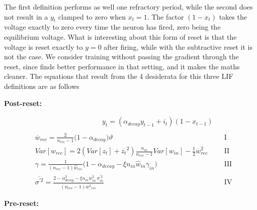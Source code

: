 The first definition performs as well one refractory period, while the second does not result in a $y_t$ clamped to zero when $x_t=1$.
The factor $(1 - x_t)$ takes the voltage exactly to zero every time the neuron has fired, zero being the equilibrium voltage. What is interesting about this form of reset is that the voltage is reset exactly to $y=0$ after firing, while with the subtractive reset it is not the case. 
We consider training without passing the gradient through the reset, since \cite{zenke2021remarkable} finds better performance in that setting, and it makes the maths cleaner.
The equations that result from the 4 desiderata for this three LIF definitions are as follows



\vspace{.7cm}
\textbf{Post-reset:}
\vspace{-.8cm}

{\small
\begin{align*}
&\hspace{4cm} y_t =  (\alpha_{decay}y_{t-1} +i_t)(1 - x_{t-1})\\  \nonumber \\
    &\overline{w}_{rec}=
 \frac{2}{n_{rec}-1}\Big(1-\alpha_{decay}\Big)\vartheta && \text{I}\\
    &Var[w_{rec}]  =  2(Var[z_t] + \overline{z_t}^2)\frac{n_{in}}{n_{rec}-1}Var[w_{in}] - \frac{1}{2}\overline{w}_{rec}^2 && \text{II}\\
    &\gamma=   \frac{1}{(n_{rec}-1)\hat{w}_{rec}}\Big( 1 -\alpha_{decay}-\xi n_{in}\hat{w}_{in} \gamma_{in} \Big)&& \text{III}\\
    &\overline{\sigma^{\prime 2}} = \frac{2-\alpha_{decay}^2-\xi n_{in}\overline{w_{in}^2} \ \overline{\sigma^{\prime 2}_{in}}}{(n_{rec}-1)\overline{w^2}_{rec}}  && \text{IV}
\end{align*}
}


\vspace{.7cm}
\textbf{Pre-reset:}
\vspace{-.8cm}

